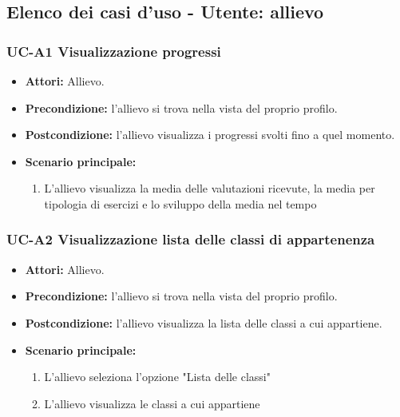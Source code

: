 \subsection{Elenco dei casi d'uso - Utente: allievo}
	\subsubsection{UC-A1 Visualizzazione progressi}
	\begin{itemize}
			\item \textbf{Attori:} Allievo.
			\item \textbf{Precondizione:} l'allievo si trova nella vista del proprio profilo.
			\item \textbf{Postcondizione:} l'allievo visualizza i progressi svolti fino a quel momento.
			\item \textbf{Scenario principale:}
				\begin{enumerate}
					\item L'allievo visualizza la media delle valutazioni ricevute, la media per tipologia di esercizi e lo sviluppo della media nel tempo
				\end{enumerate}
	\end{itemize}
	
	\subsubsection{UC-A2 Visualizzazione lista delle classi di appartenenza}
		\begin{itemize}
			\item \textbf{Attori:} Allievo.
			\item \textbf{Precondizione:} l'allievo si trova nella vista del proprio profilo.
			\item \textbf{Postcondizione:} l'allievo visualizza la lista delle classi a cui appartiene.
			\item \textbf{Scenario principale:}
			\begin{enumerate}
				\item L'allievo seleziona l'opzione "Lista delle classi"
				\item L'allievo visualizza le classi a cui appartiene
			\end{enumerate}
		\end{itemize}			


